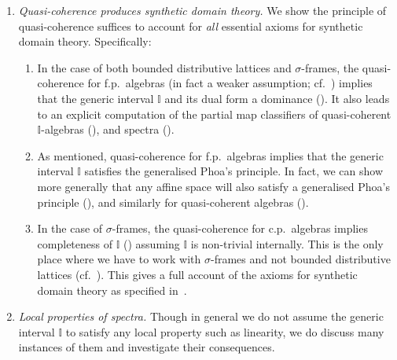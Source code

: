 \documentclass[12pt]{amsart}
\theoremstyle{definition}
\newcommand{\mbb}[1]{\mathbb{#1}}
\newcommand{\I}{\mbb I}
\begin{document}
\begin{enumerate}
  \item \emph{Quasi-coherence produces synthetic domain theory.} We show the principle of quasi-coherence suffices to account for \emph{all} essential axioms for synthetic domain theory. Specifically:
  \begin{enumerate}
    \item\label{contribution:dominance} In the case of both bounded distributive lattices and $\sigma$-frames, the quasi-coherence for f.p.\ algebras (in fact a weaker assumption; cf.\ ) implies that the generic interval $\I$ and its dual form a dominance (). It also leads to an explicit computation of the partial map classifiers of quasi-coherent $\I$-algebras (), and spectra ().
    \item As mentioned, quasi-coherence for f.p.\ algebras implies that the generic interval $\I$ satisfies the generalised Phoa's principle. In fact, we can show more generally that any affine space will also satisfy a generalised Phoa's principle (), and similarly for quasi-coherent algebras ().
    \item In the case of $\sigma$-frames, the quasi-coherence for c.p.\ algebras implies completeness of $\I$ () assuming $\I$ is non-trivial internally. 
    This is the only place where we have to work with $\sigma$-frames and not bounded distributive lattices (cf.~). This gives a full account of the axioms for synthetic domain theory as specified in~\cite{hyland1990first}. 
  \end{enumerate}

  \item \emph{Local properties of spectra.} Though in general we do not assume the generic interval $\I$ to satisfy any local property such as linearity, we do discuss many instances of them and investigate their consequences.
  \begin{enumerate}


\end{enumerate}
\end{enumerate}
\end{document}
